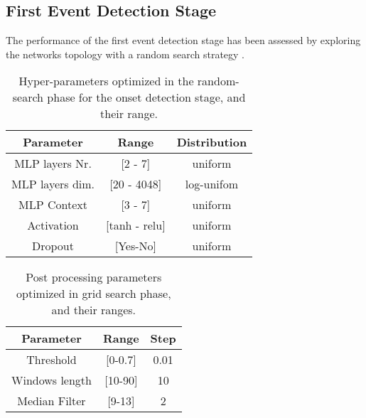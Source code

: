 \documentclass{article}
\begin{document}
\begin{sloppy}
\subsection{First Event Detection Stage}
The performance of the first event detection stage has been assessed by exploring the networks topology with a random search strategy \cite{bergstra2012random}.
\begin{table}[t]
  \caption{Hyper-parameters optimized in the random-search phase for the onset detection stage, and their range.}\label{tbl:hyper-params-mlp}
  \centering
  \footnotesize
  \begin{tabular} {|c | c | c|}
    \hline
    Parameter & Range & Distribution\\  
    \hline
    \hline                                     
    MLP layers Nr.  & [2 - 7]& uniform \\
    \hline                                     
    MLP layers dim. & [20 - 4048]& log-unifom \\
    \hline                                     
    MLP Context & [3 - 7] & uniform\\
    \hline
    Activation & [tanh - relu] & uniform\\
    \hline
    Dropout & [Yes-No] & uniform\\
    \hline
  \end{tabular}
\end{table}
%
\begin{table}[t]
  \caption{Post processing parameters optimized in grid search phase, and their ranges.}
  \label{tbl:post-proc-params-mlp}
  \centering
  \footnotesize
  \begin{tabular} {|c | c | c |}
    \hline
    Parameter     & Range  & Step\\  
    \hline
    \hline                                     
    Threshold  & [0-0.7] & 0.01\\
    \hline                                     
    Windows length & [10-90] & 10 \\
    \hline
    Median Filter & [9-13] & 2\\
    \hline                                       
  \end{tabular}
\end{table}


\end{sloppy}
\end{document}
